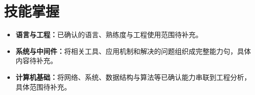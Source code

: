 \documentclass[10pt,a4paper]{article}
\begin{document}
\section{技能掌握}
\begin{itemize}[itemsep=2pt]
\item \textbf{语言与工程：}已确认的语言、熟练度与工程使用范围待补充。
\item \textbf{系统与中间件：}将相关工具、应用机制和解决的问题组织成完整能力句，具体内容待补充。
\item \textbf{计算机基础：}将网络、系统、数据结构与算法等已确认能力串联到工程分析，具体范围待补充。
\end{itemize}
\end{document}
